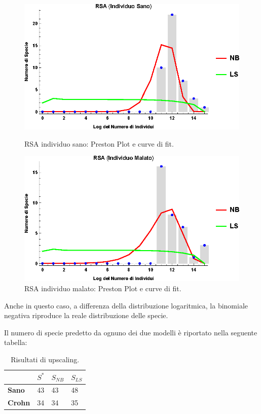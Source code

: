 \begin{figure}[H]
  \centering
  \begin{minipage}[b]{0.45\textwidth}
    \includegraphics[width=\textwidth]{Figure/rsaplotH.eps}
    \caption{RSA individuo sano: Preston Plot e curve di fit.}
    \label{fig:plotRSAH}
  \end{minipage}
  \hfill
  \begin{minipage}[b]{0.45\textwidth}
    \includegraphics[width=\textwidth]{Figure/rsaplotC.eps}
    \caption{RSA individuo malato: Preston Plot e curve di fit.}
    \label{fig:plotRSAC}
  \end{minipage}
\end{figure}



Anche in questo caso, a differenza della distribuzione logaritmica, la binomiale negativa riproduce la reale distribuzione delle specie.

Il numero di specie predetto da ognuno dei due modelli è riportato nella seguente tabella:

\begin{table}[H]
\centering
\begin{tabular}{l|l|l|l|}
\cline{2-4}
                                     & $S^*$ & $S_{NB}$ & $S_{LS}$ \\ \hline
\multicolumn{1}{|l|}{\textbf{Sano}}  & 43  & 43       & 48       \\ \hline
\multicolumn{1}{|l|}{\textbf{Crohn}} & 34  & 34       & 35       \\ \hline
\end{tabular}
\caption{Risultati di upscaling.}
\label{Tab:risultatiup}
\end{table}

